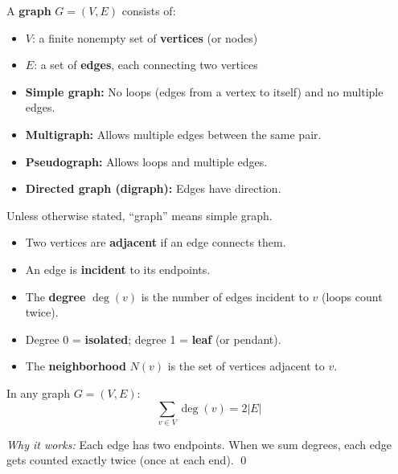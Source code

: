 \begin{definition}[Graph]
A \textbf{graph} $G = (V, E)$ consists of:
\begin{itemize}
  \item $V$: a finite nonempty set of \textbf{vertices} (or nodes)
  \item $E$: a set of \textbf{edges}, each connecting two vertices
\end{itemize}
\end{definition}

\begin{definition}
\begin{itemize}
  \item \textbf{Simple graph:} No loops (edges from a vertex to itself) and no multiple edges.
  \item \textbf{Multigraph:} Allows multiple edges between the same pair.
  \item \textbf{Pseudograph:} Allows loops and multiple edges.
  \item \textbf{Directed graph (digraph):} Edges have direction.
\end{itemize}
Unless otherwise stated, ``graph'' means simple graph.
\end{definition}

\begin{definition}
\begin{itemize}
  \item Two vertices are \textbf{adjacent} if an edge connects them.
  \item An edge is \textbf{incident} to its endpoints.
  \item The \textbf{degree} $\deg(v)$ is the number of edges incident to $v$ (loops count twice).
  \item Degree 0 = \textbf{isolated}; degree 1 = \textbf{leaf} (or pendant).
  \item The \textbf{neighborhood} $N(v)$ is the set of vertices adjacent to $v$.
\end{itemize}
\end{definition}

\begin{theorem}
In any graph $G = (V, E)$:
\[
\sum_{v \in V} \deg(v) = 2|E|
\]
\end{theorem}

\emph{Why it works:} Each edge has two endpoints. When we sum degrees, each edge gets counted exactly twice (once at each end). \qed

